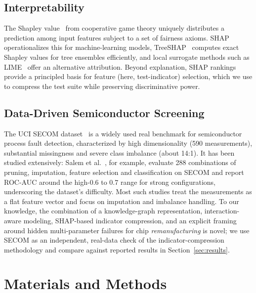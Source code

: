 \documentclass[electronics,article,submit,pdftex,moreauthors]{Definitions/mdpi}
\begin{document}
\subsection{Interpretability}
The Shapley value~\cite{shapley1953value} from cooperative game theory uniquely distributes a prediction among input features subject to a set of fairness axioms. SHAP~\cite{lundberg2017unified} operationalizes this for machine-learning models, TreeSHAP~\cite{lundberg2020local} computes exact Shapley values for tree ensembles efficiently, and local surrogate methods such as LIME~\cite{ribeiro2016lime} offer an alternative attribution. Beyond explanation, SHAP rankings provide a principled basis for feature (here, test-indicator) selection, which we use to compress the test suite while preserving discriminative power.

\subsection{Data-Driven Semiconductor Screening}
The UCI SECOM dataset~\cite{mccann2008secom} is a widely used real benchmark for semiconductor process fault detection, characterized by high dimensionality (590 measurements), substantial missingness and severe class imbalance (about 14:1). It has been studied extensively: Salem et al.~\cite{salem2018experimental}, for example, evaluate 288 combinations of pruning, imputation, feature selection and classification on SECOM and report ROC-AUC around the high-0.6 to 0.7 range for strong configurations, underscoring the dataset's difficulty. Most such studies treat the measurements as a flat feature vector and focus on imputation and imbalance handling. To our knowledge, the combination of a knowledge-graph representation, interaction-aware modeling, SHAP-based indicator compression, and an explicit framing around hidden multi-parameter failures for chip \emph{remanufacturing} is novel; we use SECOM as an independent, real-data check of the indicator-compression methodology and compare against reported results in Section~\ref{sec:results}.

\section{Materials and Methods}\label{sec:methods}
\end{document}

